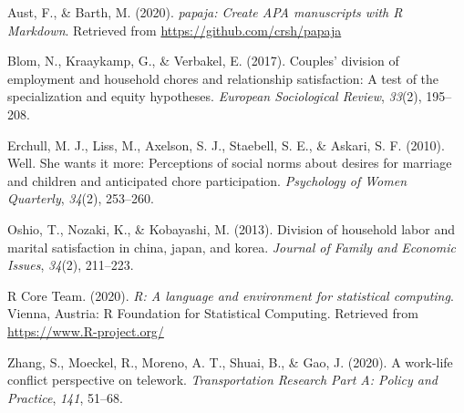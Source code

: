 \documentclass[
  english,
  man]{apa6}
\newlength{\cslhangindent}
\newenvironment{cslreferences}%
  {\setlength{\parindent}{0pt}%
  \everypar{\setlength{\hangindent}{\cslhangindent}}\ignorespaces}%
  {\par}
\begin{document}
\begingroup
\setlength{\parindent}{-0.5in}
\setlength{\leftskip}{0.5in}

\hypertarget{refs}{}
\begin{cslreferences}
\leavevmode\hypertarget{ref-R-papaja}{}%
Aust, F., \& Barth, M. (2020). \emph{papaja: Create APA manuscripts with R Markdown}. Retrieved from \url{https://github.com/crsh/papaja}

\leavevmode\hypertarget{ref-blom2017couples}{}%
Blom, N., Kraaykamp, G., \& Verbakel, E. (2017). Couples' division of employment and household chores and relationship satisfaction: A test of the specialization and equity hypotheses. \emph{European Sociological Review}, \emph{33}(2), 195--208.

\leavevmode\hypertarget{ref-erchull2010well}{}%
Erchull, M. J., Liss, M., Axelson, S. J., Staebell, S. E., \& Askari, S. F. (2010). Well. She wants it more: Perceptions of social norms about desires for marriage and children and anticipated chore participation. \emph{Psychology of Women Quarterly}, \emph{34}(2), 253--260.

\leavevmode\hypertarget{ref-oshio2013division}{}%
Oshio, T., Nozaki, K., \& Kobayashi, M. (2013). Division of household labor and marital satisfaction in china, japan, and korea. \emph{Journal of Family and Economic Issues}, \emph{34}(2), 211--223.

\leavevmode\hypertarget{ref-R-base}{}%
R Core Team. (2020). \emph{R: A language and environment for statistical computing}. Vienna, Austria: R Foundation for Statistical Computing. Retrieved from \url{https://www.R-project.org/}

\leavevmode\hypertarget{ref-zhang2020work}{}%
Zhang, S., Moeckel, R., Moreno, A. T., Shuai, B., \& Gao, J. (2020). A work-life conflict perspective on telework. \emph{Transportation Research Part A: Policy and Practice}, \emph{141}, 51--68.
\end{cslreferences}

\endgroup
\end{document}
